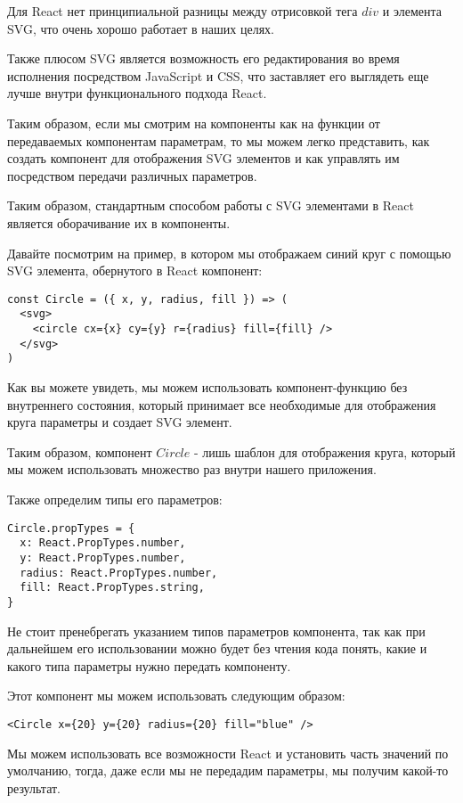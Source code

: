Для React нет принципиальной разницы между отрисовкой тега $div$ и элемента SVG, что очень хорошо работает в наших целях.

Также плюсом SVG является возможность его редактирования во время исполнения посредством JavaScript и CSS, что заставляет его выглядеть еще лучше внутри функционального подхода React. 

Таким образом, если мы смотрим на компоненты как на функции от передаваемых компонентам параметрам, то мы можем легко представить, как создать компонент для отображения SVG элементов и как управлять им посредством передачи различных параметров.

Таким образом, стандартным способом работы с SVG элементами в React является оборачивание их в компоненты.

Давайте посмотрим на пример, в котором мы отображаем синий круг с помощью SVG элемента, обернутого в React компонент:

\begin{lstlisting}
const Circle = ({ x, y, radius, fill }) => (
  <svg>
    <circle cx={x} cy={y} r={radius} fill={fill} />
  </svg>
)
\end{lstlisting}

Как вы можете увидеть, мы можем использовать компонент-функцию без внутреннего состояния, который принимает все необходимые для отображения круга параметры и создает SVG элемент.

Таким образом, компонент $Circle$ - лишь шаблон для отображения круга, который мы можем использовать множество раз внутри нашего приложения.

Также определим типы его параметров:

\begin{lstlisting}
Circle.propTypes = {
  x: React.PropTypes.number,
  y: React.PropTypes.number,
  radius: React.PropTypes.number,
  fill: React.PropTypes.string,
}
\end{lstlisting}

Не стоит пренебрегать указанием типов параметров компонента, так как при дальнейшем его использовании можно будет без чтения кода понять, какие и какого типа параметры нужно передать компоненту.

Этот компонент мы можем использовать следующим образом:

\begin{lstlisting}
<Circle x={20} y={20} radius={20} fill="blue" />
\end{lstlisting}

Мы можем использовать все возможности React и установить часть значений по умолчанию, тогда, даже если мы не передадим параметры, мы получим какой-то результат.

